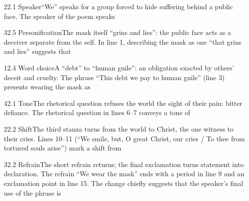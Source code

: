 \documentclass[11pt]{article}
\begin{document}
\begin{q}{2}{2.1 Speaker}{``We'' speaks for a group forced to hide suffering behind a public face.}
The speaker of the poem speaks
\end{q}

\begin{q}{3}{2.5 Personification}{The mask itself ``grins and lies'': the public face acts as a deceiver separate from the self.}
In line 1, describing the mask as one ``that grins and lies'' suggests that
\end{q}

\begin{q}{1}{2.4 Word choice}{A ``debt'' to ``human guile'': an obligation exacted by others' deceit and cruelty.}
The phrase ``This debt we pay to human guile'' (line 3) presents wearing the mask as
\end{q}

\begin{q}{4}{2.1 Tone}{The rhetorical question refuses the world the sight of their pain: bitter defiance.}
The rhetorical question in lines 6--7 conveys a tone of
\end{q}

\begin{q}{2}{2.2 Shift}{The third stanza turns from the world to Christ, the one witness to their cries.}
Lines 10--11 (``We smile, but, O great Christ, our cries / To thee from tortured souls arise'') mark a shift from
\end{q}

\begin{q}{3}{2.2 Refrain}{The short refrain returns; the final exclamation turns statement into declaration.}
The refrain ``We wear the mask'' ends with a period in line 9 and an exclamation point in line 15. The change chiefly suggests that the speaker's final use of the phrase is
\end{q}
\end{document}
